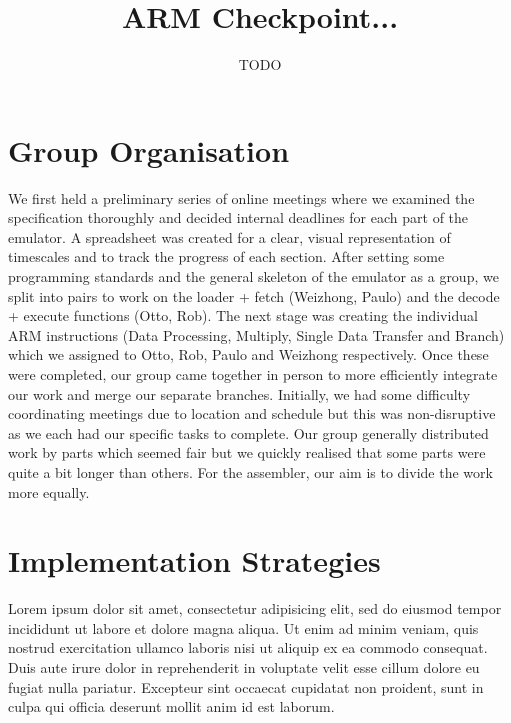 \documentclass[11pt]{article}
\begin{document}
\title{ARM Checkpoint... }
\author{TODO}

\maketitle

\section{Group Organisation}

We first held a preliminary series of online meetings where we examined the specification thoroughly and decided internal deadlines for each part of the emulator. A spreadsheet was created for a clear, visual representation of timescales and to track the progress of each section. After setting some programming standards and the general skeleton  of the emulator  as a group, we split into pairs to work on the loader + fetch (Weizhong, Paulo) and the decode + execute functions (Otto, Rob). The next stage was creating the individual ARM instructions (Data Processing, Multiply, Single Data Transfer and Branch) which we assigned to Otto, Rob, Paulo and Weizhong respectively. Once these were completed, our group came together in person to more efficiently integrate our work and merge our separate branches. Initially, we had some difficulty coordinating meetings due to location and schedule but this was non-disruptive as we each had our specific tasks to complete. Our group generally distributed work by parts which seemed fair but we quickly realised that some parts were quite a bit longer than others. For the assembler, our aim is to divide the work more equally.

\section{Implementation Strategies}

Lorem ipsum dolor sit amet, consectetur adipisicing elit, sed do eiusmod tempor
incididunt ut labore et dolore magna aliqua. Ut enim ad minim veniam, quis
nostrud exercitation ullamco laboris nisi ut aliquip ex ea commodo consequat.
Duis aute irure dolor in reprehenderit in voluptate velit esse cillum dolore eu
fugiat nulla pariatur. Excepteur sint occaecat cupidatat non proident, sunt in
culpa qui officia deserunt mollit anim id est laborum.
\end{document}
